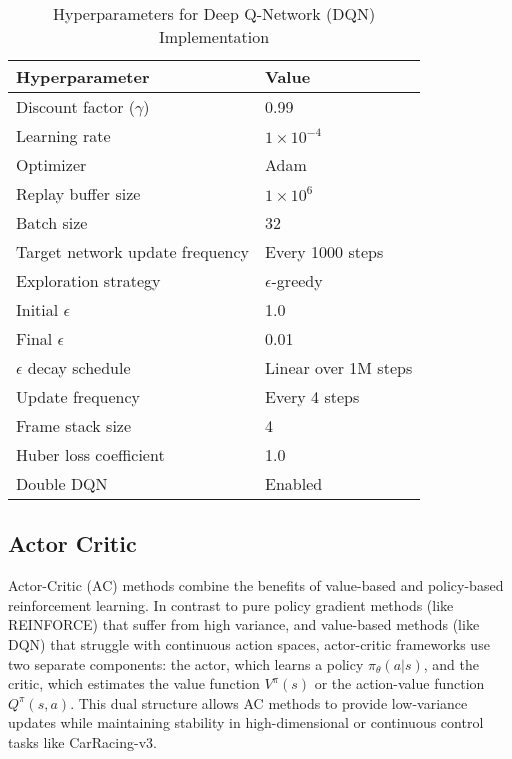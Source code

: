\documentclass[conference]{IEEEtran}
\begin{document}
\begin{table}[ht]
\centering
\caption{Hyperparameters for Deep Q-Network (DQN) Implementation}
\label{tab:dqn_hyperparams}
\begin{tabular}{ll}
\toprule
\textbf{Hyperparameter} & \textbf{Value} \\
\midrule
Discount factor ($\gamma$)       & 0.99 \\
Learning rate                    & $1 \times 10^{-4}$ \\
Optimizer                        & Adam \\
Replay buffer size               & $1 \times 10^6$ \\
Batch size                       & 32 \\
Target network update frequency  & Every 1000 steps \\
Exploration strategy             & $\epsilon$-greedy \\
Initial $\epsilon$               & 1.0 \\
Final $\epsilon$                 & 0.01 \\
$\epsilon$ decay schedule        & Linear over 1M steps \\
Update frequency                 & Every 4 steps \\
Frame stack size                 & 4 \\
Huber loss coefficient           & 1.0 \\
Double DQN                       & Enabled \\
\bottomrule
\end{tabular}
\end{table}

\subsection{Actor Critic}
Actor-Critic (AC) methods combine the benefits of value-based and policy-based reinforcement learning. In contrast to pure policy gradient methods (like REINFORCE) that suffer from high variance, and value-based methods (like DQN) that struggle with continuous action spaces, actor-critic frameworks use two separate components: the actor, which learns a policy $\pi_{\theta}(a | s)$, and the critic, which estimates the value function $V^{\pi}(s)$ or the action-value function $Q^{\pi} (s, a)$. This dual structure allows AC methods to provide low-variance updates while maintaining stability in high-dimensional or continuous control tasks like CarRacing-v3.
\end{document}
